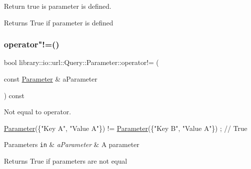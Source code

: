 Return true is parameter is defined. 

\begin{DoxyReturn}{Returns}
True if parameter is defined 
\end{DoxyReturn}
\mbox{\label{classlibrary_1_1io_1_1url_1_1_query_1_1_parameter_a5c57390202d4bfb16ef94252f1d4618d}} 
\subsubsection{\texorpdfstring{operator"!=()}{operator!=()}}
{\footnotesize\ttfamily bool library\+::io\+::url\+::\+Query\+::\+Parameter\+::operator!= (\begin{DoxyParamCaption}\item[{const \hyperlink{classlibrary_1_1io_1_1url_1_1_query_1_1_parameter}{Parameter} \&}]{a\+Parameter }\end{DoxyParamCaption}) const}



Not equal to operator. 


\begin{DoxyCode}
\hyperlink{classlibrary_1_1io_1_1url_1_1_query_1_1_parameter_ad6160646a07cb92213403426dbba4c64}{Parameter}(\{\textcolor{stringliteral}{"Key A"}, \textcolor{stringliteral}{"Value A"}\}) != \hyperlink{classlibrary_1_1io_1_1url_1_1_query_1_1_parameter_ad6160646a07cb92213403426dbba4c64}{Parameter}(\{\textcolor{stringliteral}{"Key B"}, \textcolor{stringliteral}{"Value A"}\}) ; \textcolor{comment}{// True}
\end{DoxyCode}



\begin{DoxyParams}[1]{Parameters}
\mbox{\tt in}  & {\em a\+Parameter} & A parameter \\
\hline
\end{DoxyParams}
\begin{DoxyReturn}{Returns}
True if parameters are not equal 
\end{DoxyReturn}
\mbox{\label{classlibrary_1_1io_1_1url_1_1_query_1_1_parameter_ac00203e201de2c2e510ae59e01a9a12c}} 
